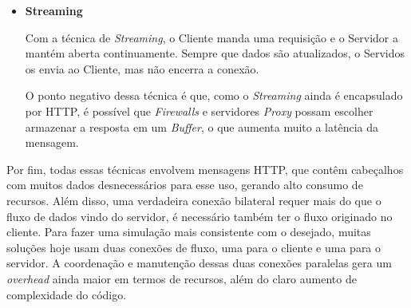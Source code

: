 \documentclass[a4paper,12pt]{article}
\begin{document}
\begin{itemize}






    \item \textbf{Streaming}

    Com a técnica de \emph{Streaming}, o Cliente manda uma requisição e o Servidor a mantém aberta continuamente. Sempre que dados são atualizados, o Servidos os envia ao Cliente, mas não encerra a conexão.

    O ponto negativo dessa técnica é que, como o \emph{Streaming} ainda é encapsulado por HTTP, é possível que \emph{Firewalls} e servidores \emph{Proxy} possam escolher armazenar a resposta em um \emph{Buffer}, o que aumenta muito a latência da mensagem.

\end{itemize}

Por fim, todas essas técnicas envolvem mensagens HTTP, que contêm cabeçalhos com muitos dados desnecessários para esse uso, gerando alto consumo de recursos. Além disso, uma verdadeira conexão bilateral requer mais do que o fluxo de dados vindo do servidor, é necessário também ter o fluxo originado no cliente. Para fazer uma simulação mais consistente com o desejado, muitas soluções hoje usam duas conexões de fluxo, uma para o cliente e uma para o servidor. A coordenação e manutenção dessas duas conexões paralelas gera um \emph{overhead} ainda maior em termos de recursos, além do claro aumento de complexidade do código.
\end{document}
